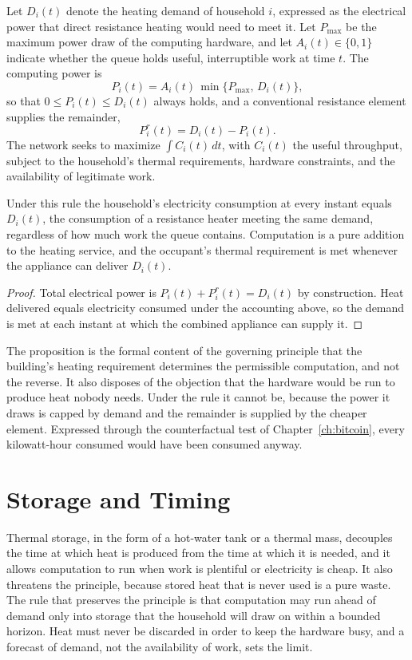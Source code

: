 Let $D_i(t)$ denote the heating demand of household $i$, expressed as the electrical power that direct resistance heating would need to meet it. Let $P_{\max}$ be the maximum power draw of the computing hardware, and let $A_i(t)\in\{0,1\}$ indicate whether the queue holds useful, interruptible work at time $t$. The computing power is
\[
P_i(t)=A_i(t)\,\min\{P_{\max},\,D_i(t)\},
\]
so that $0\le P_i(t)\le D_i(t)$ always holds, and a conventional resistance element supplies the remainder,
\[
P^{r}_i(t)=D_i(t)-P_i(t).
\]
The network seeks to maximize $\int C_i(t)\,dt$, with $C_i(t)$ the useful throughput, subject to the household's thermal requirements, hardware constraints, and the availability of legitimate work.

\begin{proposition}
\label{prop:pureaddition}
Under this rule the household's electricity consumption at every instant equals $D_i(t)$, the consumption of a resistance heater meeting the same demand, regardless of how much work the queue contains. Computation is a pure addition to the heating service, and the occupant's thermal requirement is met whenever the appliance can deliver $D_i(t)$.
\end{proposition}

\begin{proof}
Total electrical power is $P_i(t)+P^{r}_i(t)=D_i(t)$ by construction. Heat delivered equals electricity consumed under the accounting above, so the demand is met at each instant at which the combined appliance can supply it.
\end{proof}

The proposition is the formal content of the governing principle that the building's heating requirement determines the permissible computation, and not the reverse. It also disposes of the objection that the hardware would be run to produce heat nobody needs. Under the rule it cannot be, because the power it draws is capped by demand and the remainder is supplied by the cheaper element. Expressed through the counterfactual test of Chapter~\ref{ch:bitcoin}, every kilowatt-hour consumed would have been consumed anyway.

\section{Storage and Timing}

Thermal storage, in the form of a hot-water tank or a thermal mass, decouples the time at which heat is produced from the time at which it is needed, and it allows computation to run when work is plentiful or electricity is cheap. It also threatens the principle, because stored heat that is never used is a pure waste. The rule that preserves the principle is that computation may run ahead of demand only into storage that the household will draw on within a bounded horizon. Heat must never be discarded in order to keep the hardware busy, and a forecast of demand, not the availability of work, sets the limit.

